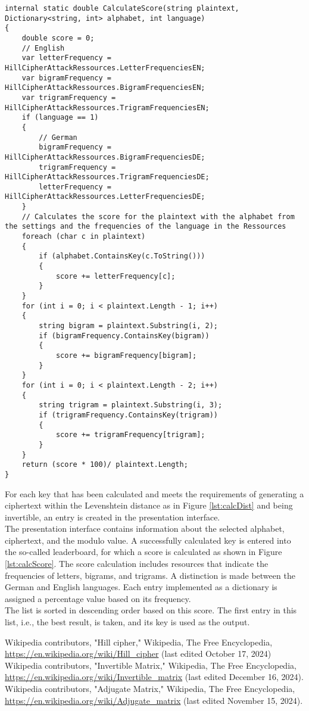 \documentclass[conference]{IEEEtran}
\begin{document}
\begin{lstlisting}[caption={CalculateScore method}, label={lst:calcScore}]
internal static double CalculateScore(string plaintext, Dictionary<string, int> alphabet, int language)
{
    double score = 0;
    // English
    var letterFrequency = HillCipherAttackRessources.LetterFrequenciesEN;
    var bigramFrequency = HillCipherAttackRessources.BigramFrequenciesEN;
    var trigramFrequency = HillCipherAttackRessources.TrigramFrequenciesEN;
    if (language == 1)
    {
        // German
        bigramFrequency = HillCipherAttackRessources.BigramFrequenciesDE;
        trigramFrequency = HillCipherAttackRessources.TrigramFrequenciesDE;
        letterFrequency = HillCipherAttackRessources.LetterFrequenciesDE;
    }
    // Calculates the score for the plaintext with the alphabet from the settings and the frequencies of the language in the Ressources
    foreach (char c in plaintext)
    {
        if (alphabet.ContainsKey(c.ToString()))
        {
            score += letterFrequency[c];
        }
    }
    for (int i = 0; i < plaintext.Length - 1; i++)
    {
        string bigram = plaintext.Substring(i, 2);
        if (bigramFrequency.ContainsKey(bigram))
        {
            score += bigramFrequency[bigram];
        }
    }
    for (int i = 0; i < plaintext.Length - 2; i++)
    {
        string trigram = plaintext.Substring(i, 3);
        if (trigramFrequency.ContainsKey(trigram))
        {
            score += trigramFrequency[trigram];
        }
    }
    return (score * 100)/ plaintext.Length;
}
\end{lstlisting}

For each key that has been calculated and meets the requirements of generating a ciphertext within the Levenshtein distance as in Figure \ref{lst:calcDist} and being invertible, an entry is created in the presentation interface. 
\\
The presentation interface contains information about the selected alphabet, ciphertext, and the modulo value. A successfully calculated key is entered into the so-called leaderboard, for which a score is calculated as shown in Figure  \ref{lst:calcScore}. 
The score calculation includes resources that indicate the frequencies of letters, bigrams, and trigrams. A distinction is made between the German and English languages. Each entry implemented as a dictionary is assigned a percentage value based on its frequency.
\\
The list is sorted in descending order based on this score. The first entry in this list, i.e., the best result, is taken, and its key is used as the output.

\begin{thebibliography}{9}
 Wikipedia contributors, "Hill cipher," Wikipedia, The Free Encyclopedia, \url{https://en.wikipedia.org/wiki/Hill_cipher} (last edited October 17, 2024)
 Wikipedia contributors, "Invertible Matrix," Wikipedia, The Free Encyclopedia, \url{https://en.wikipedia.org/wiki/Invertible_matrix} (last edited December 16, 2024).
  Wikipedia contributors, "Adjugate Matrix," Wikipedia, The Free Encyclopedia, \url{https://en.wikipedia.org/wiki/Adjugate_matrix} (last edited November 15, 2024).
\end{thebibliography}
\end{document}
